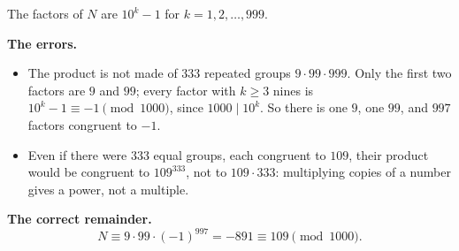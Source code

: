The factors of $N$ are $10^k-1$ for $k=1,2,\dots,999$.

\textbf{The errors.}
\begin{itemize}
\item The product is not made of $333$ repeated groups $9\cdot99\cdot999$. Only the first two factors are $9$ and $99$; every factor with $k\ge3$ nines is $10^k-1\equiv-1\pmod{1000}$, since $1000\mid10^k$. So there is one $9$, one $99$, and $997$ factors congruent to $-1$.
\item Even if there were $333$ equal groups, each congruent to $109$, their product would be congruent to $109^{333}$, not to $109\cdot333$: multiplying copies of a number gives a power, not a multiple.
\end{itemize}

\textbf{The correct remainder.}
\[N\equiv9\cdot99\cdot(-1)^{997}=-891\equiv\boxed{109}\pmod{1000}.\]
